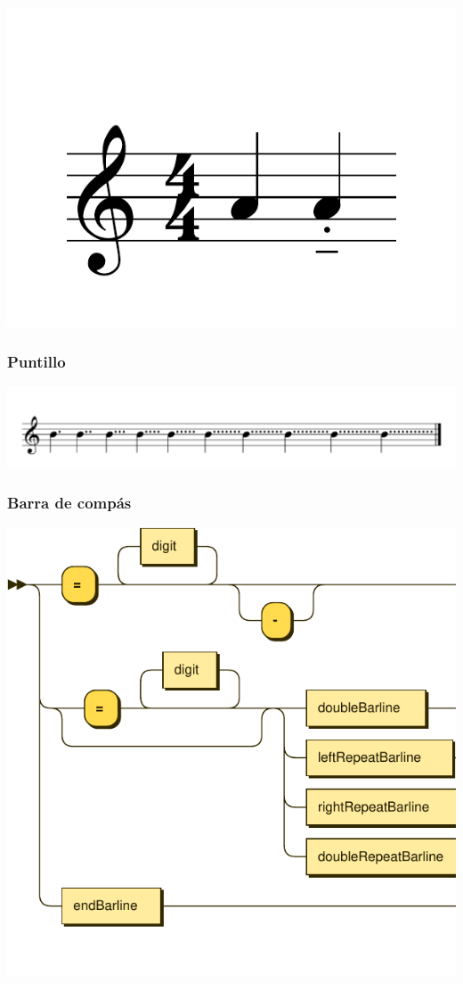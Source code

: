 \documentclass{article}
\begin{document}
\includegraphics[scale=0.5]{figures_tests/pdf/skern/articulations7.pdf}


\subsubsection{Puntillo}

\includegraphics[scale=0.35]{figures_tests/pdf/skern/augmentationDots.pdf}


\subsubsection{Barra de compás}

\includegraphics[scale=0.5]{figures_railroad/pdf/skern/barlines.pdf}
\end{document}
